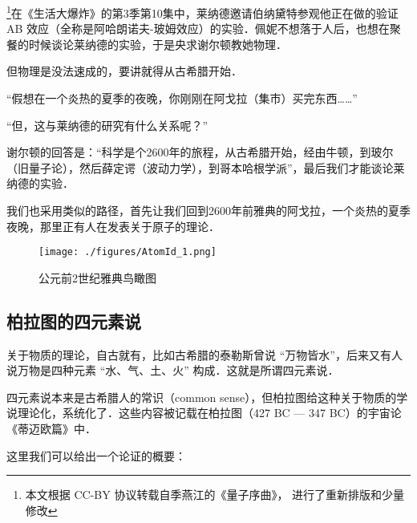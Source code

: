 
\footnote{本文根据 CC-BY 协议转载自季燕江的《量子序曲》， 进行了重新排版和少量修改}在《生活大爆炸》的第3季第10集中，莱纳德邀请伯纳黛特参观他正在做的验证 AB 效应（全称是阿哈朗诺夫-玻姆效应）的实验．佩妮不想落于人后，也想在聚餐的时候谈论莱纳德的实验，于是央求谢尔顿教她物理．

但物理是没法速成的，要讲就得从古希腊开始．

“假想在一个炎热的夏季的夜晚，你刚刚在阿戈拉（集市）买完东西……”

“但，这与莱纳德的研究有什么关系呢？”

谢尔顿的回答是：“科学是个2600年的旅程，从古希腊开始，经由牛顿，到玻尔（旧量子论），然后薛定谔（波动力学），到哥本哈根学派”，最后我们才能谈论莱纳德的实验．

我们也采用类似的路径，首先让我们回到2600年前雅典的阿戈拉，一个炎热的夏季夜晚，那里正有人在发表关于原子的理论．

\begin{figure}[ht]
\centering
\texttt{[image: ./figures/AtomId\_1.png]}
\caption{公元前2世纪雅典鸟瞰图} \label{AtomId_fig1}
\end{figure}

\subsection{柏拉图的四元素说}

关于物质的理论，自古就有，比如古希腊的泰勒斯曾说 “万物皆水”，后来又有人说万物是四种元素 “水、气、土、火” 构成．这就是所谓四元素说．

四元素说本来是古希腊人的常识（common sense），但柏拉图给这种关于物质的学说理论化，系统化了．这些内容被记载在柏拉图（427 BC — 347 BC）的宇宙论《蒂迈欧篇》中．

这里我们可以给出一个论证的概要：

